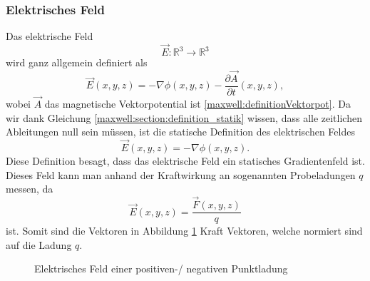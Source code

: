 \subsubsection{Elektrisches Feld}
Das elektrische Feld
\[
\vec{E}:\mathbb{R}^3 \rightarrow \mathbb{R}^3
\]
wird ganz allgemein definiert als
\begin{equation}
\vec{E}(x,y,z)
=
- \nabla\phi(x,y,z) - \frac{\partial \vec{A}}{\partial t}(x,y,z),
\label{maxwell:section:definiton_allgemein_elektrischesFeld}
\end{equation}
wobei $\vec{A}$ das magnetische Vektorpotential ist \eqref{maxwell:definitionVektorpot}.
Da wir dank Gleichung \eqref{maxwell:section:definition_statik} wissen, dass alle zeitlichen Ableitungen null sein müssen, ist die statische Definition des elektrischen Feldes
\begin{equation}
\vec{E}(x,y,z)
=
- \nabla\phi(x,y,z).
\label{maxwell:section:definition_statisch_elektrischesFeld}
\end{equation}
Diese Definition besagt, dass das elektrische Feld ein statisches Gradientenfeld ist.
Dieses Feld kann man anhand der Kraftwirkung an sogenannten Probeladungen $q$ messen, da
\[
\vec{E}(x,y,z)
=
\frac{\vec{F}(x,y,z)}{q}
\]
ist.
Somit sind die Vektoren in Abbildung \ref{maxwell:section:E-Feld_punktladung} Kraft Vektoren, welche normiert sind auf die Ladung $q$.
\begin{figure}[h]
	\centering
	\caption{Elektrisches Feld einer positiven-/ negativen Punktladung}
	\label{maxwell:section:E-Feld_punktladung}
\end{figure}

